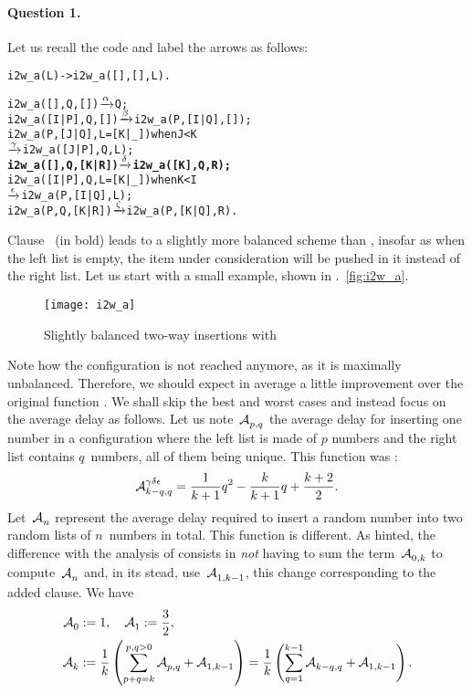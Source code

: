 \paragraph{Question 1.}
Let us recall the code and label the arrows as follows:
\begin{alltt}
i2w_a(L) -> i2w_a([],[],L).

i2w_a(   [],    Q,     []) \(\smashedrightarrow{\alpha}\) Q;
i2w_a([I|P],    Q,     []) \(\smashedrightarrow{\beta}\) i2w_a(    P,[I|Q],[]);
i2w_a(    P,[J|Q],L=[K|_]) when J < K 
                            \(\smashedrightarrow{\gamma}\) i2w_a([J|P],    Q, L);
\textbf{i2w_a(   [],    Q,  [K|R]) \(\smashedrightarrow{\delta}\) i2w_a(  [K],    Q, R);}
i2w_a([I|P],    Q,L=[K|_]) when K < I
                           \(\smashedrightarrow{\epsilon}\) i2w_a(    P,[I|Q], L);
i2w_a(    P,    Q,  [K|R]) \(\smashedrightarrow{\zeta}\) i2w_a(    P,[K|Q], R).
\end{alltt}
Clause~\clause{\delta} (in bold) leads to a slightly more balanced
scheme than , insofar as when the left list is
empty, the item under consideration will be pushed in it instead of
the right list. Let us start with a small example, shown in
\fig.~\vref{fig:i2w_a}.
\begin{figure}
\centering
\texttt{[image: i2w\_a]}
\caption{Slightly balanced two\hyp{}way insertions with
  \label{fig:i2w_a}}
\end{figure}
Note how the configuration \erlcode{[],[\(c\),\(a\),\(b\)]} is not
reached anymore, as it is maximally unbalanced. Therefore, we should
expect in average a little improvement over the original function
. We shall skip the best and worst cases and
instead focus on the average delay as follows. Let us
note~\(\mathcal{A}_{p,q}^{\texttt{}}\) the average delay for inserting one number in a
configuration where the left list is made of \(p\) numbers and the
right list contains \(q\)~numbers, all of them being unique. This
function was :
\[
\mathcal{A}_{k-q,q}^{\texttt{\(\gamma\delta\epsilon\)}}
  = \frac{1}{k+1}{q^2} - \frac{k}{k+1}{q} + \frac{k+2}{2}.
\]
Let~\(\mathcal{A}_{n}^{\texttt{}}\) represent the average delay required to insert a
random number into two random lists of \(n\)~numbers in total. This
function is different. As hinted, the difference with the analysis of
 consists in \emph{not} having to sum the
term~\(\mathcal{A}_{0,k}^{\texttt{}}\) to compute~\(\mathcal{A}_{n}^{\texttt{}}\) and, in its stead,
use~\(\mathcal{A}_{1,k-1}^{\texttt{}}\), this change corresponding to the added
clause. We have
\begin{align*}
  \mathcal{A}_{0}^{\texttt{}} &:= 1,\quad
  \mathcal{A}_{1}^{\texttt{}} := \frac{3}{2},\\
  \mathcal{A}_{k}^{\texttt{}} &:= \frac{1}{k}
     \left(\sum_{p+q=k}^{p,q>0}{\mathcal{A}_{p,q}^{\texttt{}}} +
     \mathcal{A}_{1,k-1}^{\texttt{}}\right)
     = \frac{1}{k}\left(\sum_{q=1}^{k-1}{\mathcal{A}_{k-q,q}^{\texttt{}}} +
     \mathcal{A}_{1,k-1}^{\texttt{}}\right).
\end{align*}
